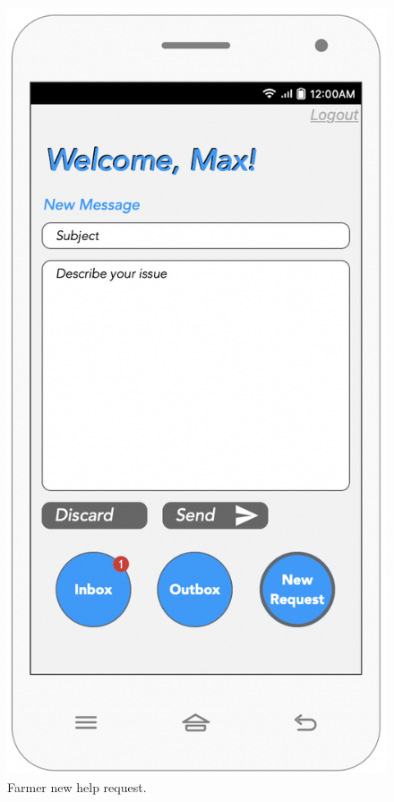 \begin{multicols}{2}
\begin{figure}[H]
\centering
\includegraphics[scale=0.5]{../images_diagrams/mock_ups/dd/Req02_NewReq.png}
\caption{\label{fig:mock_request}Farmer new help request.}
\end{figure}
\end{multicols}


